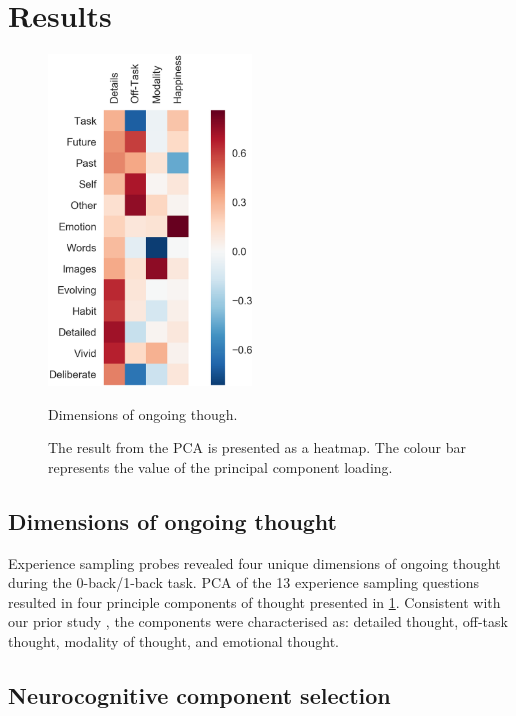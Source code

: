 \section{Results}
\label{study3:results}

\begin{figure}

    \centering
    \includegraphics[width=0.48\textwidth]{study3/image/study3pca.png}
    \caption{Dimensions of ongoing though.}
    \caption*{The result from the PCA is presented as a heatmap. The colour bar represents the value of the principal component loading.}
    \label{fig:study3:figPCA}

\end{figure}

\subsection{Dimensions of ongoing thought}
Experience sampling probes revealed four unique dimensions of ongoing thought during the 0-back/1-back task. PCA of the 13 experience sampling questions resulted in four principle components of thought presented in \cref{fig:study3:figPCA}. Consistent with our prior study \cite{Poerio2017}, the components were characterised as: detailed thought, off-task thought, modality of thought, and emotional thought.


\subsection{Neurocognitive component selection}

